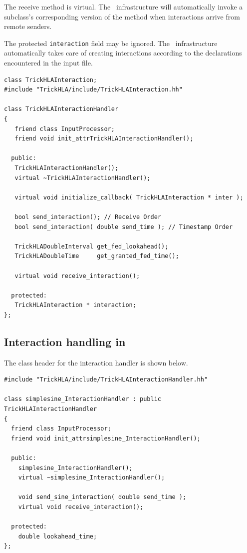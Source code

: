 The receive method is virtual.
The \TrickHLA\ infrastructure will automatically invoke a subclass's
corresponding version of the method when interactions arrive from remote
senders.

The protected {\tt interaction} field may be ignored.
The \TrickHLA\ infrastructure automatically takes care of creating
interactions according to the declarations encountered in the input file.

\begin{lstlisting}[caption={The {\tt TrickHLAInteractionHandler} class},label={list:trickhla-interaction-handler}]
class TrickHLAInteraction;
#include "TrickHLA/include/TrickHLAInteraction.hh"

class TrickHLAInteractionHandler
{
   friend class InputProcessor;
   friend void init_attrTrickHLAInteractionHandler();

  public:
   TrickHLAInteractionHandler();
   virtual ~TrickHLAInteractionHandler();

   virtual void initialize_callback( TrickHLAInteraction * inter );

   bool send_interaction(); // Receive Order
   bool send_interaction( double send_time ); // Timestamp Order

   TrickHLADoubleInterval get_fed_lookahead();
   TrickHLADoubleTime     get_granted_fed_time();
   
   virtual void receive_interaction();

  protected:
   TrickHLAInteraction * interaction;
};
\end{lstlisting}

\subsection{Interaction handling in \simplesine}

The class header for the \simplesine interaction handler is shown below.


\begin{lstlisting}[caption={{\tt simplesine\_InteractionHandler} header file},label={list:simplesine-interaction-handler-header}]
#include "TrickHLA/include/TrickHLAInteractionHandler.hh"

class simplesine_InteractionHandler : public TrickHLAInteractionHandler
{
  friend class InputProcessor;
  friend void init_attrsimplesine_InteractionHandler();

  public:
    simplesine_InteractionHandler();
    virtual ~simplesine_InteractionHandler();

    void send_sine_interaction( double send_time );
    virtual void receive_interaction();

  protected:
    double lookahead_time;
};
\end{lstlisting}

